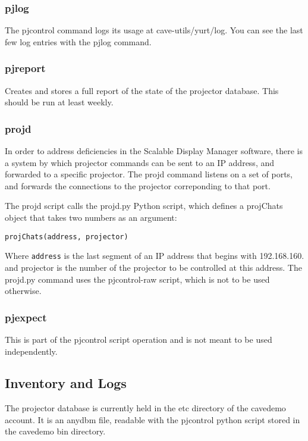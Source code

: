 \documentclass[11pt]{article}
\newcommand{\cmd}[1]{\texttt{#1}\xspace}
\begin{document}
\subsubsection{pjlog}

The pjcontrol command logs its usage at cave-utils/yurt/log.
You can see the last few log entries with the pjlog command.

\subsubsection{pjreport}

Creates and stores a full report of the state of the projector
database.  This should be run at least weekly.

\subsubsection{projd}

In order to address deficiencies in the Scalable Display Manager
software, there is a system by which projector commands can be sent to
an IP address, and forwarded to a specific projector.  The projd
command listens on a set of ports, and forwards the connections to the
projector correponding to that port.

The projd script calls the projd.py Python script, which defines a
projChats object that takes two numbers as an argument:

\begin{verbatim}
projChats(address, projector)
\end{verbatim}

Where \cmd{address} is the last segment of an IP address that begins
with 192.168.160. and projector is the number of the projector to be
controlled at this address.  The projd.py command uses the
pjcontrol-raw script, which is not to be used otherwise.

\subsubsection{pjexpect}

This is part of the pjcontrol script operation and is not meant to be
used independently.


\subsection{Inventory and Logs}
\label{logging}

The projector database is currently held in the etc directory of the
cavedemo account.  It is an anydbm file, readable with the pjcontrol
python script stored in the cavedemo bin directory.
\end{document}
